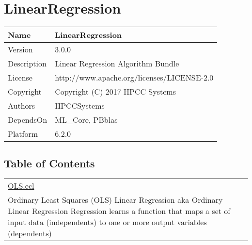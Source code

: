 \chapter*{LinearRegression}
\hypertarget{ecldoc:toc:LinearRegression}{}

\begin{tabularx}{\textwidth}{|l|X|}
\hline
Name & LinearRegression \\
\hline
Version & 3.0.0 \\
\hline
Description & Linear Regression Algorithm Bundle \\
\hline
License & http://www.apache.org/licenses/LICENSE-2.0 \\
\hline
Copyright & Copyright (C) 2017 HPCC Systems \\
\hline
Authors & HPCCSystems \\
\hline
DependsOn & ML\_Core, PBblas \\
\hline
Platform & 6.2.0 \\
\hline
\end{tabularx}

\section*{Table of Contents}
{\renewcommand{\arraystretch}{1.5}
\begin{longtable}{|p{\textwidth}|}
\hline
\hyperlink{ecldoc:toc:LinearRegression.OLS}{OLS.ecl} \\
Ordinary Least Squares (OLS) Linear Regression aka Ordinary Linear Regression Regression learns a function that maps a set of input data (independents) to one or more output variables (dependents) \\
\hline
\end{longtable}
}



